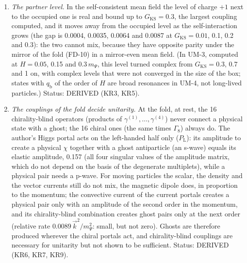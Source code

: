\documentclass[
  10pt,
]{article}
\begin{document}
\begin{enumerate}
  charges) and one positive one, and towards the null cone the energy
  falls without bound along some directions (\(-1514\) at
  \(\lvert Z\rvert = 0.999\) of the mixing) and rises along others: the
  repulsive gas has no lowest-energy occupation at the first order, and
  its Kohn-Sham states are the symmetric stationary occupation, not a
  ground state (an assumption of the solution). Status: DERIVED (KR8).
\item
  \emph{The partner level.} In the self-consistent mean field the level
  of charge \(+1\) next to the occupied one is real and bound up to
  \(G_{\mathrm{KS}} = 0.3\), the largest coupling computed, and it moves
  away from the occupied level as the self-interaction grows (the gap is
  0.0004, 0.0035, 0.0064 and 0.0087 at \(G_{\mathrm{KS}} = 0.01\), 0.1,
  0.2 and 0.3): the two cannot mix, because they have opposite parity
  under the mirror of the fold (FD-10) in a mirror-even mean field. (In
  UM-3, computed at \(H = 0.05\), 0.15 and \(0.3\,m_\Psi\), this level
  turned complex from \(G_{\mathrm{KS}} = 0.3\), 0.7 and 1 on, with
  complex levels that were not converged in the size of the box; states
  with \(q_{\mathrm{b}}\) of the order of \(H\) are broad resonances in
  UM-4, not long-lived particles.) Status: DERIVED (KR3, KR5).
\item
  \emph{The couplings of the fold decide unitarity.} At the fold, at
  rest, the 16 chirality-blind operators (products of
  \(\gamma^{(1)}, \dots, \gamma^{(4)}\)) never connect a physical state
  with a ghost; the 16 chiral ones (the same times \(\Gamma_8\)) always
  do. The author's Higgs portal acts on the left-handed half only
  (\(P_{\mathrm{L}}\)): its amplitude to create a physical \(\chi\)
  together with a ghost antiparticle (an s-wave) equals its elastic
  amplitude, 0.157 (all four singular values of the amplitude matrix,
  which do not depend on the basis of the degenerate multiplets), while
  a physical pair needs a p-wave. For moving particles the scalar, the
  density and the vector currents still do not mix, the magnetic dipole
  does, in proportion to the momentum; the convective current of the
  current portals creates a physical pair only with an amplitude of the
  second order in the momentum, and its chirality-blind combination
  creates ghost pairs only at the next order (relative rate
  \(0.0089\,\vec k^2/m_\Psi^2\): small, but not zero). Ghosts are
  therefore produced wherever the chiral portals act, and
  chirality-blind couplings are necessary for unitarity but not shown to
  be sufficient. Status: DERIVED (KR6, KR7, KR9).
\end{enumerate}
\end{document}
